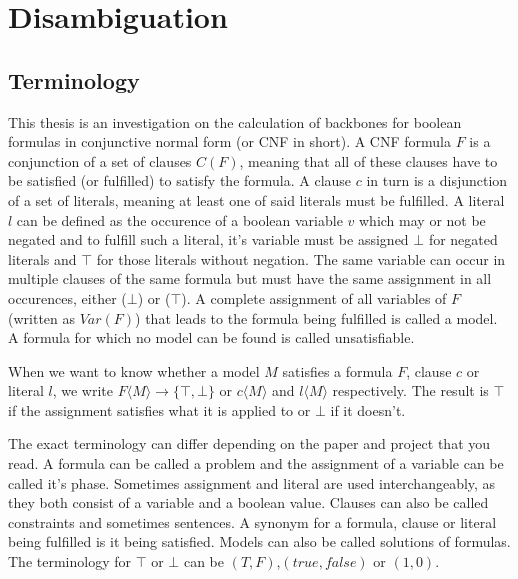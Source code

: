 \section{Disambiguation}
\subsection{Terminology}
This thesis is an investigation on the calculation of backbones for boolean formulas in conjunctive normal form (or CNF in short). A CNF formula $F$ is a conjunction of a set of clauses $C(F)$, meaning that all of these clauses have to be satisfied (or fulfilled) to satisfy the formula. A clause $c$ in turn is a disjunction of a set of literals, meaning at least one of said literals must be fulfilled. A literal $l$ can be defined as the occurence of a boolean variable $v$ which may or not be negated and to fulfill such a literal, it's variable must be assigned $\bot$ for negated literals and $\top$ for those literals without negation. The same variable can occur in multiple clauses of the same formula but must have the same assignment in all occurences, either ($\bot$) or ($\top$). A complete assignment of all variables of $F$ (written as $Var(F)$) that leads to the formula being fulfilled is called a model. A formula for which no model can be found is called unsatisfiable.

When we want to know whether a model $M$ satisfies a formula $F$, clause $c$ or literal $l$, we write $F\langle M\rangle \rightarrow \{\top,\bot\}$ or $c\langle M\rangle$ and $l\langle M\rangle$ respectively. The result is $\top$ if the assignment satisfies what it is applied to or $\bot$ if it doesn't.



The exact terminology can differ depending on the paper and project that you read. A formula can be called a problem and the assignment of a variable can be called it's phase. Sometimes assignment and literal are used interchangeably, as they both consist of a variable and a boolean value. Clauses can also be called constraints and sometimes sentences. A synonym for a formula, clause or literal being fulfilled is it being satisfied. Models can also be called solutions of formulas. The terminology for $\top$ or $\bot$ can be $(T,F)$,$(true,false)$ or $(1,0)$.



